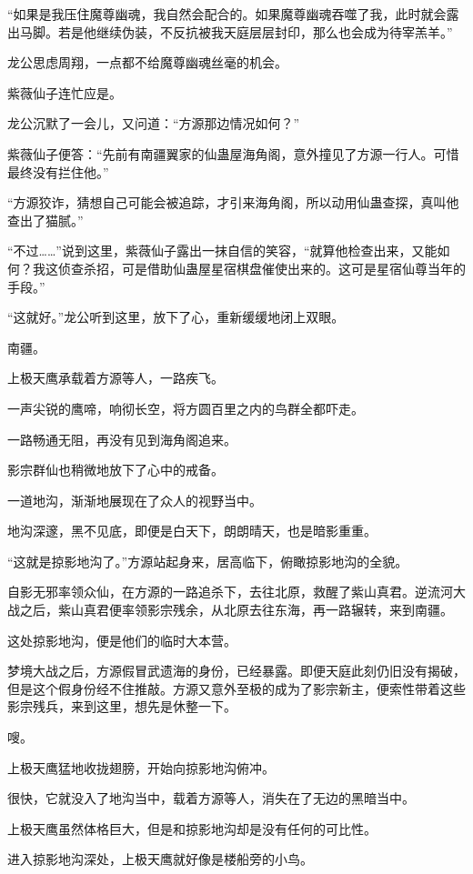 \begin{this_body}
“如果是我压住魔尊幽魂，我自然会配合的。如果魔尊幽魂吞噬了我，此时就会露出马脚。若是他继续伪装，不反抗被我天庭层层封印，那么也会成为待宰羔羊。”

龙公思虑周翔，一点都不给魔尊幽魂丝毫的机会。

紫薇仙子连忙应是。

龙公沉默了一会儿，又问道：“方源那边情况如何？”

紫薇仙子便答：“先前有南疆翼家的仙蛊屋海角阁，意外撞见了方源一行人。可惜最终没有拦住他。”

“方源狡诈，猜想自己可能会被追踪，才引来海角阁，所以动用仙蛊查探，真叫他查出了猫腻。”

“不过……”说到这里，紫薇仙子露出一抹自信的笑容，“就算他检查出来，又能如何？我这侦查杀招，可是借助仙蛊屋星宿棋盘催使出来的。这可是星宿仙尊当年的手段。”

“这就好。”龙公听到这里，放下了心，重新缓缓地闭上双眼。

南疆。

上极天鹰承载着方源等人，一路疾飞。

一声尖锐的鹰啼，响彻长空，将方圆百里之内的鸟群全都吓走。

一路畅通无阻，再没有见到海角阁追来。

影宗群仙也稍微地放下了心中的戒备。

一道地沟，渐渐地展现在了众人的视野当中。

地沟深邃，黑不见底，即便是白天下，朗朗晴天，也是暗影重重。

“这就是掠影地沟了。”方源站起身来，居高临下，俯瞰掠影地沟的全貌。

自影无邪率领众仙，在方源的一路追杀下，去往北原，救醒了紫山真君。逆流河大战之后，紫山真君便率领影宗残余，从北原去往东海，再一路辗转，来到南疆。

这处掠影地沟，便是他们的临时大本营。

梦境大战之后，方源假冒武遗海的身份，已经暴露。即便天庭此刻仍旧没有揭破，但是这个假身份经不住推敲。方源又意外至极的成为了影宗新主，便索性带着这些影宗残兵，来到这里，想先是休整一下。

嗖。

上极天鹰猛地收拢翅膀，开始向掠影地沟俯冲。

很快，它就没入了地沟当中，载着方源等人，消失在了无边的黑暗当中。

上极天鹰虽然体格巨大，但是和掠影地沟却是没有任何的可比性。

进入掠影地沟深处，上极天鹰就好像是楼船旁的小鸟。


\end{this_body}
